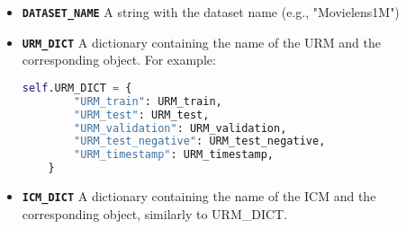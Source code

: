 \begin{itemize}
    \item \textbf{\texttt{DATASET\_NAME}} A string with the dataset name (e.g., "Movielens1M")
    \item \textbf{\texttt{URM\_DICT}} A dictionary containing the name of the URM and the corresponding object. For example:
    \begin{lstlisting}[language=Python]
    self.URM_DICT = {
        "URM_train": URM_train,
        "URM_test": URM_test,
        "URM_validation": URM_validation,
        "URM_test_negative": URM_test_negative,
        "URM_timestamp": URM_timestamp,
    }
    \end{lstlisting}
    
    \item \textbf{\texttt{ICM\_DICT}} A dictionary containing the name of the ICM and the corresponding object, similarly to URM\_DICT.
\end{itemize}








